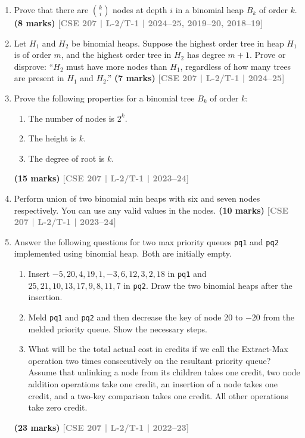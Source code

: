 \documentclass[12pt]{article}
\newcommand{\yr}[1]{\hfill\textcolor{gray}{\small\textbf{[#1]}}}
\newcommand{\mk}[1]{\textcolor{orange!70!black}{\small\textbf{(#1 marks)}}}
\begin{document}
\begin{enumerate}

\item Prove that there are $\binom{k}{i}$ nodes at depth $i$ in a binomial heap $B_k$ of order $k$.
\mk{8} \yr{CSE 207 | L-2/T-1 | 2024--25, 2019--20, 2018--19}


\item Let $H_1$ and $H_2$ be binomial heaps. Suppose the highest order tree in heap $H_1$ is of order $m$, and the highest order tree in $H_2$ has degree $m+1$. Prove or disprove: ``$H_2$ must have more nodes than $H_1$, regardless of how many trees are present in $H_1$ and $H_2$.''
\mk{7} \yr{CSE 207 | L-2/T-1 | 2024--25}


\item Prove the following properties for a binomial tree $B_k$ of order $k$:
\begin{enumerate}
  \item The number of nodes is $2^k$.
  \item The height is $k$.
  \item The degree of root is $k$.
\end{enumerate}
\mk{15} \yr{CSE 207 | L-2/T-1 | 2023--24}


\item Perform union of two binomial min heaps with six and seven nodes respectively. You can use any valid values in the nodes.
\mk{10} \yr{CSE 207 | L-2/T-1 | 2023--24}


\item Answer the following questions for two max priority queues \texttt{pq1} and \texttt{pq2} implemented using binomial heap. Both are initially empty.
\begin{enumerate}
  \item Insert $-5, 20, 4, 19, 1, -3, 6, 12, 3, 2, 18$ in \texttt{pq1} and $25, 21, 10, 13, 17, 9, 8, 11, 7$ in \texttt{pq2}. Draw the two binomial heaps after the insertion.
  \item Meld \texttt{pq1} and \texttt{pq2} and then decrease the key of node 20 to $-20$ from the melded priority queue. Show the necessary steps.
  \item What will be the total actual cost in credits if we call the Extract-Max operation two times consecutively on the resultant priority queue? Assume that unlinking a node from its children takes one credit, two node addition operations take one credit, an insertion of a node takes one credit, and a two-key comparison takes one credit. All other operations take zero credit.
\end{enumerate}
\mk{23} \yr{CSE 207 | L-2/T-1 | 2022--23}



\end{enumerate}
\end{document}
